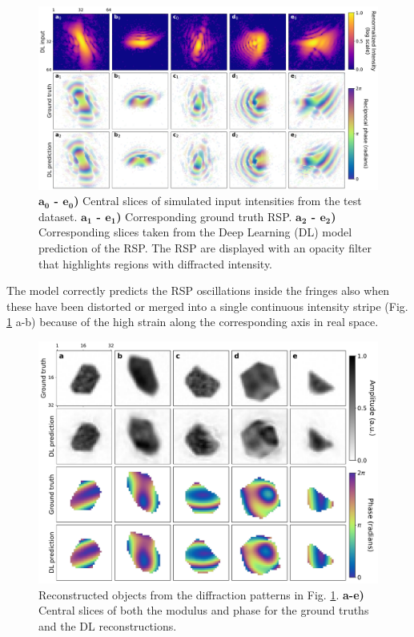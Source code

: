 \begin{figure}[H]
    \centering
    \includegraphics[width=\textwidth]{figures/Phasing/RSP_3Dsim.pdf}
    \caption{\textbf{\(\boldsymbol{a_0}\) - \(\boldsymbol{e_0}\))} Central slices of simulated input intensities from 
     the test dataset. \textbf{\(\boldsymbol{a_1}\) - \(\boldsymbol{e_1}\))} Corresponding ground truth RSP. 
     \textbf{\(\boldsymbol{a_2}\) - \(\boldsymbol{e_2}\))} Corresponding slices taken from the Deep Learning (DL)
     model prediction of the RSP. The RSP are displayed with an opacity filter 
     that highlights regions with diffracted intensity.}
    \label{fig:RSP_paper_sim}
\end{figure}

The model correctly predicts the RSP oscillations inside the fringes also when these have been distorted or merged into
a single continuous intensity stripe (Fig. \ref{fig:RSP_paper_sim} a-b) because of the high strain along the corresponding 
axis in real space.

\begin{figure}[H]
    \centering
    \includegraphics[width=\textwidth]{figures/Phasing/obj_3Dsim.pdf}
    \caption{Reconstructed objects from the diffraction patterns in Fig. \ref{fig:RSP_paper_sim}.  
    \textbf{a-e)} Central slices of both the modulus and phase for the ground truths and the DL reconstructions.}
    \label{fig:obj_paper_sim}
\end{figure}

